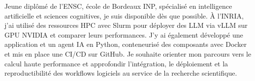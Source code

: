 
\begin{cvparagraph}
Jeune diplômé de l’ENSC, école de Bordeaux INP, spécialisé en intelligence artificielle et sciences cognitives, je suis disponible dès que possible. À l’INRIA, j’ai utilisé des ressources HPC avec Slurm pour déployer des LLM via vLLM sur GPU NVIDIA et comparer leurs performances. J’y ai également développé une application et un agent IA en Python, conteneurisé des composants avec Docker et mis en place une CI/CD sur GitHub. Je souhaite orienter mon parcours vers le calcul haute performance et approfondir l’intégration, le déploiement et la reproductibilité des workflows logiciels au service de la recherche scientifique.
\end{cvparagraph}
